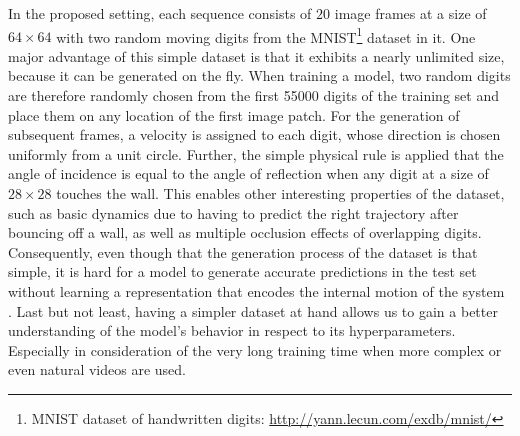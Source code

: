 In the proposed setting, each sequence consists of $20$ image frames at a size of $ 64 \times 64 $ with two random moving digits from the MNIST\footnote{MNIST dataset of handwritten digits: \url{http://yann.lecun.com/exdb/mnist/}} dataset in it. One major advantage of this simple dataset is that it exhibits a nearly unlimited size, because it can be generated on the fly. When training a model, two random digits are therefore randomly chosen from the first \num{55000} digits of the training set and place them on any location of the first image patch. For the generation of subsequent frames, a velocity is assigned to each digit, whose direction is chosen uniformly from a unit circle. Further, the simple physical rule is applied that the angle of incidence is equal to the angle of reflection when any digit at a size of $ 28 \times 28 $ touches the wall. This enables other interesting properties of the dataset, such as basic dynamics due to having to predict the right trajectory after bouncing off a wall, as well as multiple occlusion effects of overlapping digits. Consequently, even though that the generation process of the dataset is that simple, it is hard for a model to generate accurate predictions in the test set without learning a representation that encodes the internal motion of the system \parencite[p. 6]{conv_lstm_nowcasting}. Last but not least, having a simpler dataset at hand allows us to gain a better understanding of the model's behavior in respect to its hyperparameters. Especially in consideration of the very long training time when more complex or even natural videos are used.

